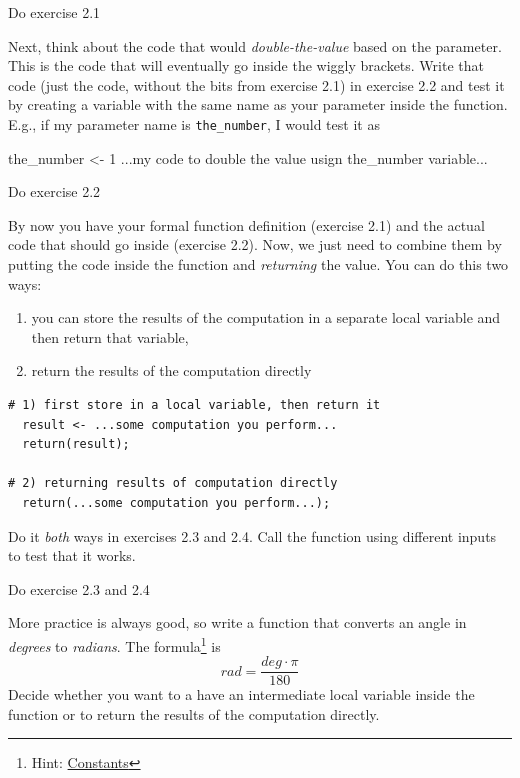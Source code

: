 \documentclass[
]{book}
\newenvironment{Shaded}{\begin{snugshade}}{\end{snugshade}}
\newcommand{\DecValTok}[1]{\textcolor[rgb]{0.00,0.00,0.81}{#1}}
\newcommand{\NormalTok}[1]{#1}
\newcommand{\OtherTok}[1]{\textcolor[rgb]{0.56,0.35,0.01}{#1}}
\providecommand{\tightlist}{%
  \setlength{\itemsep}{0pt}\setlength{\parskip}{0pt}}
\begin{document}
Do exercise 2.1

Next, think about the code that would \emph{double-the-value} based on the parameter. This is the code that will eventually go inside the wiggly brackets. Write that code (just the code, without the bits from exercise 2.1) in exercise 2.2 and test it by creating a variable with the same name as your parameter inside the function. E.g., if my parameter name is \texttt{the\_number}, I would test it as

\begin{Shaded}
\begin{Highlighting}[]
\NormalTok{the\_number }\OtherTok{\textless{}{-}} \DecValTok{1}
\NormalTok{...my code to double the value usign the\_number variable...}
\end{Highlighting}
\end{Shaded}

Do exercise 2.2

By now you have your formal function definition (exercise 2.1) and the actual code that should go inside (exercise 2.2). Now, we just need to combine them by putting the code inside the function and \emph{returning} the value. You can do this two ways:

\begin{enumerate}
\def\labelenumi{\arabic{enumi})}
\tightlist
\item
  you can store the results of the computation in a separate local variable and then return that variable,
\item
  return the results of the computation directly
\end{enumerate}

\begin{verbatim}
# 1) first store in a local variable, then return it
  result <- ...some computation you perform...
  return(result);

# 2) returning results of computation directly
  return(...some computation you perform...);
\end{verbatim}

Do it \emph{both} ways in exercises 2.3 and 2.4. Call the function using different inputs to test that it works.

Do exercise 2.3 and 2.4

More practice is always good, so write a function that converts an angle in \emph{degrees} to \emph{radians}. The formula\footnote{Hint: \href{https://stat.ethz.ch/R-manual/R-devel/library/base/html/Constants.html}{Constants}} is
\[rad = \frac{deg \cdot \pi}{180}\]
Decide whether you want to a have an intermediate local variable inside the function or to return the results of the computation directly.
\end{document}
